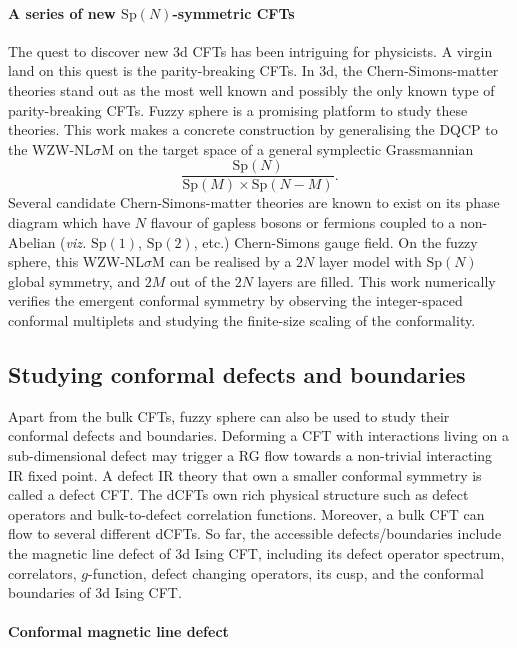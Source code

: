 \documentclass{timesjhep}
\begin{document}
\paragraph{A series of new $\mathrm{Sp}(N)$-symmetric CFTs~\cite{Zhou2024Oct}}

The quest to discover new 3d CFTs has been intriguing for physicists. A virgin land on this quest is the parity-breaking CFTs. In 3d, the Chern-Simons-matter theories stand out as the most well known and possibly the only known type of parity-breaking CFTs. Fuzzy sphere is a promising platform to study these theories. This work makes a concrete construction by generalising the DQCP to the WZW-NL$\sigma$M on the target space of a general symplectic Grassmannian 
\begin{equation}
    \frac{\mathrm{Sp}(N)}{\mathrm{Sp}(M)\times\mathrm{Sp}(N-M)}.
\end{equation}
Several candidate Chern-Simons-matter theories are known to exist on its phase diagram which have $N$ flavour of gapless bosons or fermions coupled to a non-Abelian (\textit{viz.} $\mathrm{Sp}(1)$, $\mathrm{Sp}(2)$, etc.) Chern-Simons gauge field. On the fuzzy sphere, this WZW-NL$\sigma$M can be realised by a $2N$ layer model with $\mathrm{Sp}(N)$ global symmetry, and $2M$ out of the $2N$ layers are filled. This work numerically verifies the emergent conformal symmetry by observing the integer-spaced conformal multiplets and studying the finite-size scaling of the conformality. 

\subsection{Studying conformal defects and boundaries}

Apart from the bulk CFTs, fuzzy sphere can also be used to study their conformal defects and boundaries. Deforming a CFT with interactions living on a sub-dimensional defect may trigger a RG flow towards a non-trivial interacting IR fixed point. A defect IR theory that own a smaller conformal symmetry is called a defect CFT. The dCFTs own rich physical structure such as defect operators and bulk-to-defect correlation functions. Moreover, a bulk CFT can flow to several different dCFTs. So far, the accessible defects/boundaries include the magnetic line defect of 3d Ising CFT, including its defect operator spectrum, correlators, $g$-function, defect changing operators, its cusp, and the conformal boundaries of 3d Ising CFT. 

\paragraph{Conformal magnetic line defect~\cite{Hu2023Aug}}
\end{document}

